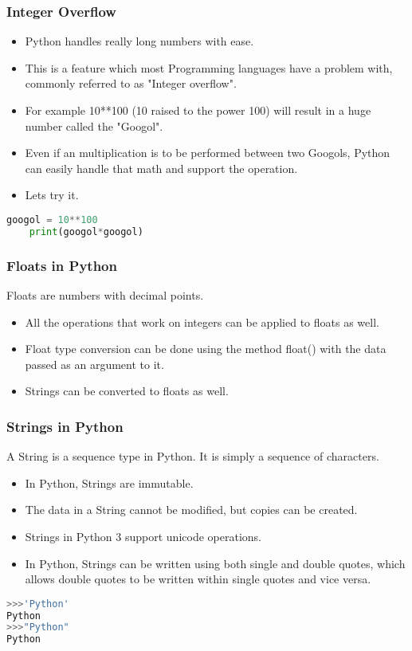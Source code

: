 \documentclass{beamer}
\begin{document}
\begin{frame}[fragile]
\frametitle{Integer Overflow}
\begin{itemize}
\item Python handles really long numbers with ease.
\item This is a feature which most Programming languages have a problem with, commonly referred to as "Integer overflow".
\item For example 10**100 (10 raised to the power 100) will result in a huge number called the "Googol".
\item Even if an multiplication is to be performed between two Googols, Python can easily handle that math and support the operation.
\item Lets try it.
\end{itemize}
\begin{lstlisting}[language=Python]
	googol = 10**100
	print(googol*googol)
\end{lstlisting}
\end{frame}

\begin{frame}
\frametitle{Floats in Python}
Floats are numbers with decimal points. 
\begin{itemize}
\item All the operations that work on integers can be applied to floats as well.
\item Float type conversion can be done using the method float() with the data passed as an argument to it.
\item Strings can be converted to floats as well.

\end{itemize}
\end{frame}

\begin{frame}[fragile]
\frametitle{Strings in Python}
A String is a sequence type in Python. It is simply a sequence of characters.
\begin{itemize}
\item In Python, Strings are immutable.
\item The data in a String cannot be modified, but copies can be created.
\item Strings in Python 3 support unicode operations.
\item In Python, Strings can be written using both single and double quotes, which allows  double quotes to be written within single quotes and vice versa.

\end{itemize}
\begin{lstlisting}[language=Python]
>>>'Python'
Python
>>>"Python"
Python
\end{lstlisting}
\end{frame}
\end{document}
